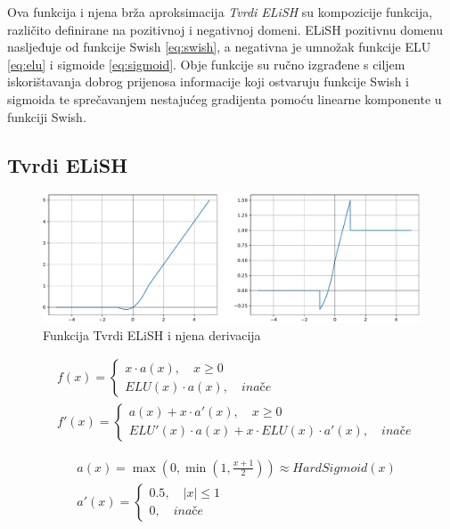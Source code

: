 \documentclass[times, utf8, numeric, diplomski]{fer}
\def\otherwise{\textit{inače}}
\begin{document}
Ova funkcija i njena brža aproksimacija \textit{Tvrdi ELiSH} su kompozicije funkcija, različito definirane na pozitivnoj i negativnoj domeni. ELiSH pozitivnu domenu nasljeđuje od funkcije Swish \eqref{eq:swish}, a negativna je umnožak funkcije ELU \eqref{eq:elu} i sigmoide \eqref{eq:sigmoid}. Obje funkcije su ručno izgrađene s ciljem iskorištavanja dobrog prijenosa informacije koji ostvaruju funkcije Swish i sigmoida te sprečavanjem nestajućeg gradijenta pomoću linearne komponente u funkciji Swish. \citep{elish}

\subsection{Tvrdi ELiSH}
\label{func:hard_elish}

\begin{figure}[H]
\includegraphics[width=\textwidth]{func_Hard_ELiSH.pdf}
\centering
\caption{Funkcija Tvrdi ELiSH i njena derivacija}
\label{fig:hard_elish}
\end{figure}

\begin{equation}
\begin{split}
&f(x) =
	\begin{cases}
		x \cdot a(x), \quad x \geq 0 \\
		ELU(x) \cdot a(x), \quad \otherwise
	\end{cases} \\
&f'(x) = \begin{cases}
	a(x) + x \cdot a'(x), \quad x \geq 0 \\
	ELU'(x) \cdot a(x) + x \cdot ELU(x) \cdot a'(x), \quad \otherwise
\end{cases}
\end{split}
\end{equation}

\begin{equation}
\begin{split}
&a(x) = \max(0, \min(1, \frac{x+1}{2})) \approx HardSigmoid(x) \\
&a'(x) =
\begin{cases}
	0.5, \quad |x| \leq 1 \\
	0, \quad \otherwise
\end{cases}	
\end{split}
\end{equation}
\end{document}
